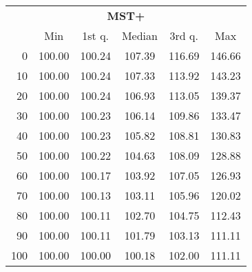 \begin{tabular}{r|ccccc}
  \multicolumn{6}{c}{{\bf MST+}} \\
  & Min & 1st q. & Median & 3rd q. & Max \\ \hline\hline
  0 & 100.00 & 100.24 & 107.39 & 116.69 & 146.66
\\ 10 & 100.00 & 100.24 & 107.33 & 113.92 & 143.23
\\ 20 & 100.00 & 100.24 & 106.93 & 113.05 & 139.37
\\ 30 & 100.00 & 100.23 & 106.14 & 109.86 & 133.47
\\ 40 & 100.00 & 100.23 & 105.82 & 108.81 & 130.83
\\ 50 & 100.00 & 100.22 & 104.63 & 108.09 & 128.88
\\ 60 & 100.00 & 100.17 & 103.92 & 107.05 & 126.93
\\ 70 & 100.00 & 100.13 & 103.11 & 105.96 & 120.02
\\ 80 & 100.00 & 100.11 & 102.70 & 104.75 & 112.43
\\ 90 & 100.00 & 100.11 & 101.79 & 103.13 & 111.11
\\ 100 & 100.00 & 100.00 & 100.18 & 102.00 & 111.11
\end{tabular}
